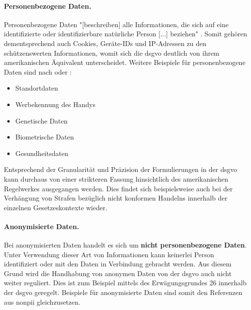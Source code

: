 
\paragraph{Personenbezogene Daten.}
\label{sec:Grundlagen:para:Personenbezogene Daten}
Personenbezogene Daten "[beschreiben] alle Informationen, die sich auf eine identifizierte oder identifizierbare natürliche Person [...] beziehen" \cite{DSGVOArt4}. Somit gehören dementsprechend auch Cookies, Geräte-IDs und IP-Adressen zu den schützenswerten Informationen, womit sich die \ac{dsgvo} deutlich von ihrem amerikanischen Äquivalent unterscheidet. Weitere Beispiele für personenbezogene Daten sind nach \cite{Matuszewska2021} oder \cite{DSGVOPerDa}:

\begin{itemize}
	\item Standortdaten
	\item Werbekennung des Handys
	\item Genetische Daten
	\item Biometrische Daten
	\item Gesundheitsdaten
\end{itemize}

\noindent Entsprechend der Granularität und Präzision der Formulierungen in der \ac{dsgvo} kann durchaus von einer strikteren Fassung hinsichtlich des amerikanischen Regelwerkes ausgegangen werden. Dies findet sich beispielsweise auch bei der Verhängung von Strafen bezüglich nicht konformen Handelns innerhalb der einzelnen Gesetzeskontexte wieder.


\paragraph{Anonymisierte Daten.}
\label{sec:Grundlagen:para:Anonymisierte Daten}
Bei anonymisierten Daten handelt es sich um \textbf{nicht personenbezogene Daten}. Unter Verwendung dieser Art von Informationen kann keinerlei Person identifiziert oder mit den Daten in Verbindung gebracht werden. Aus diesem Grund wird die Handhabung von anonymen Daten von der \ac{dsgvo} auch nicht weiter reguliert. Dies ist zum Beispiel mittels des Erwägungsgrundes 26 \cite{DSGVOEg26} innerhalb der \ac{dsgvo} geregelt. Beispiele für anonymisierte Daten sind somit den Referenzen aus \ac{nonpii} gleichzusetzen.


